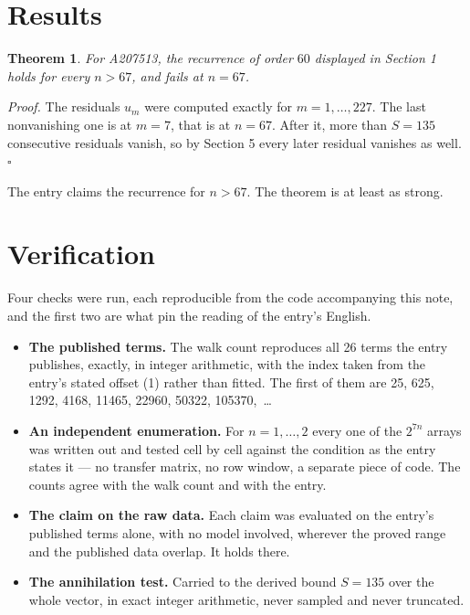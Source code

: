 \documentclass[11pt]{article}
\newtheorem{theorem}{Theorem}
\theoremstyle{definition}
\begin{document}
\section{Results}

\begin{theorem} For A207513, the recurrence of order $60$ displayed in Section 1 holds for every $n > 67$, and fails at $n = 67$.\end{theorem}

{\itshape Proof.} The residuals $u_m$ were computed exactly for $m = 1,\dots,227$. The last nonvanishing one is at $m = 7$, that is at $n = 67$. After it, more than $S = 135$ consecutive residuals vanish, so by Section 5 every later residual vanishes as well. $\square$

The entry claims the recurrence for $n > 67$. The theorem is at least as strong.

\section{Verification}

Four checks were run, each reproducible from the code accompanying this note, and the first two are what pin the reading of the entry's English.

\begin{itemize}

\item {\bfseries The published terms.} The walk count reproduces all 26 terms the entry publishes, exactly, in integer arithmetic, with the index taken from the entry's stated offset (1) rather than fitted. The first of them are 25, 625, 1292, 4168, 11465, 22960, 50322, 105370,~\dots

\item {\bfseries An independent enumeration.} For $n = 1,\dots,2$ every one of the $2^{7n}$ arrays was written out and tested cell by cell against the condition as the entry states it --- no transfer matrix, no row window, a separate piece of code. The counts agree with the walk count and with the entry.

\item {\bfseries The claim on the raw data.} Each claim was evaluated on the entry's published terms alone, with no model involved, wherever the proved range and the published data overlap. It holds there.

\item {\bfseries The annihilation test.} Carried to the derived bound $S = 135$ over the whole vector, in exact integer arithmetic, never sampled and never truncated.

\end{itemize}
\end{document}
